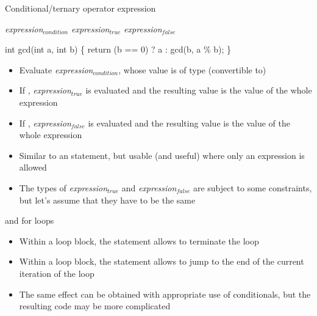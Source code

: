 \begin{frame}[fragile]{Conditional/ternary operator expression}

  \begin{center}
    \textit{expression}$_{condition}$  \textit{expression}$_{true}$ \code{:} \textit{expression}$_{false}$
  \end{center}

  \begin{codeblock}
int gcd(int a, int b)
\{
  return (b == 0) \alert{?} a \alert{:} gcd(b, a \% b);
\}\end{codeblock}

  \begin{itemize}
  \item Evaluate \textit{expression}$_{condition}$, whose value is of type
    (convertible to) 
  \item If , \textit{expression}$_{true}$ is evaluated and the
    resulting value is the value of the whole expression
  \item If , \textit{expression}$_{false}$ is evaluated and the
    resulting value is the value of the whole expression
  \end{itemize}

  \begin{itemize}
  \item Similar to an  statement, but usable (and useful) where only an
    expression is allowed
  \item The types of \textit{expression}$_{true}$ and
    \textit{expression}$_{false}$ are subject to some constraints, but let's
    assume that they have to be the same
  \end{itemize}

\end{frame}

\begin{frame}{ and  for loops}

  \begin{itemize}
  \item<1-> Within a loop block, the  statement allows to terminate
    the loop
  \item<2-> Within a loop block, the  statement allows to jump to
    the end of the current iteration of the loop
  \item<3> The same effect can be obtained with appropriate use of conditionals,
    but the resulting code may be more complicated
  \end{itemize}
\end{frame}

